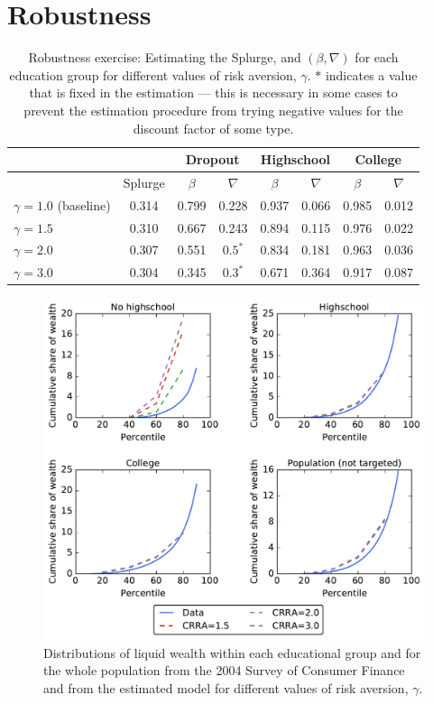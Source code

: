 \documentclass[../HAFiscal]{subfiles}
\begin{document}
\FloatBarrier
\section{Robustness}
\label{sec:robustness}

\begin{table}[th]
\begin{center}
\begin{tabular}{lc|cccccc} 
	\toprule
	& & \multicolumn{2}{c}{Dropout} & \multicolumn{2}{c}{Highschool} & \multicolumn{2}{c}{College} \\ \midrule 
	 & Splurge & $\beta$ & $\nabla$ & $\beta$ & $\nabla$ & $\beta$ & $\nabla$ \\ \midrule 
	$\gamma = 1.0$ (baseline) & 0.314 & 0.799 & 0.228 & 0.937 & 0.066 & 0.985 & 0.012 \\ 
	$\gamma = 1.5$ & 0.310 & 0.667 & 0.243 & 0.894 & 0.115 & 0.976 & 0.022 \\
	$\gamma = 2.0$ & 0.307 & 0.551 & $0.5^*$ & 0.834 & 0.181 & 0.963 & 0.036 \\
	$\gamma = 3.0$ & 0.304 & 0.345 & $0.3^*$ & 0.671 & 0.364 & 0.917 & 0.087 
	\\ \bottomrule 
\end{tabular}
\end{center}
\caption{Robustness exercise: Estimating the Splurge, and $(\beta,\nabla)$ for each education group for different values of risk aversion, $\gamma$. $*$ indicates a value that is fixed in the estimation --- this is necessary in some cases to prevent the estimation procedure from trying negative values for the discount factor of some type.}
\label{tab:robustness_gamma}
\end{table}



\begin{figure}[th]
\begin{center}
	\includegraphics[width=.9\textwidth]{../Figures/LorenzPoints_robustness.pdf}
	\caption{Distributions of liquid wealth within each educational group and for the whole population from the 2004 Survey of Consumer Finance and from the estimated model for different values of risk aversion, $\gamma$.}
	\label{fig:LorenzPts_robustness}
\end{center}
\end{figure}
\end{document}
